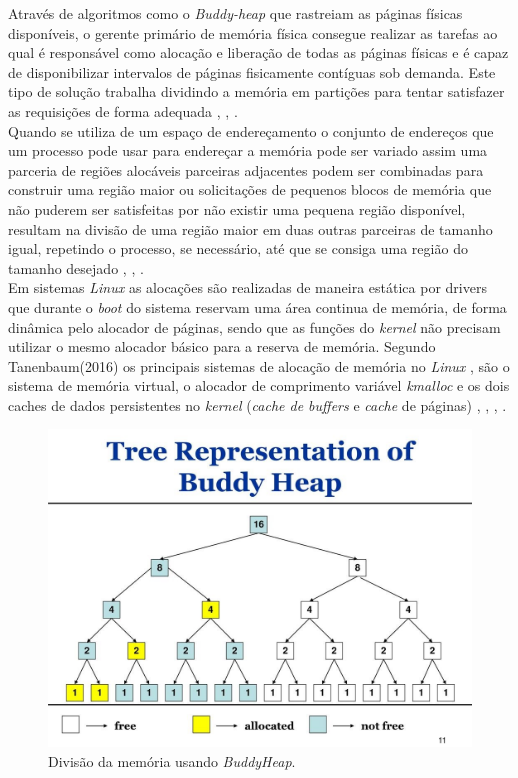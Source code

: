 Através de algoritmos como o \emph{Buddy-heap} que rastreiam as páginas físicas disponíveis, o gerente primário de memória física consegue realizar as tarefas ao qual é responsável como alocação e liberação de todas as páginas físicas e é capaz de disponibilizar intervalos de páginas fisicamente contíguas sob demanda. Este tipo de solução trabalha dividindo a memória em partições para tentar satisfazer as requisições de forma adequada \cite{ufscar2019}, \cite{silberschatz2000}, \cite{stallings2004}.\\
Quando se utiliza de um espaço de endereçamento o conjunto de endereços que um processo pode usar para endereçar a memória pode ser variado assim uma parceria de regiões alocáveis parceiras adjacentes podem ser combinadas para construir uma região maior ou solicitações de pequenos blocos de memória que não puderem ser satisfeitas por não existir uma pequena região disponível, resultam na divisão de uma região maior em duas outras parceiras de tamanho igual, repetindo o processo, se necessário, até que se consiga uma região do tamanho desejado \cite{ufscar2019}, \cite{silberschatz2000}, \cite{stallings2004}.\\
Em sistemas \emph{Linux} as alocações são realizadas de maneira estática por drivers que durante o \emph{boot} do sistema reservam uma área continua de memória, de forma dinâmica pelo alocador de páginas, sendo que as funções do \emph{kernel} não precisam utilizar o mesmo alocador básico para a reserva de memória. Segundo Tanenbaum(2016) os principais sistemas de alocação de memória no \emph{Linux} , são o sistema de memória virtual, o alocador de comprimento variável \emph{kmalloc} e os dois caches de dados persistentes no \emph{kernel} (\emph{cache de buffers} e \emph{cache} de páginas) \cite{Tanenbaum2016}, \cite{ufscar2019}, \cite{silberschatz2000}, \cite{stallings2004}.
\begin{figure}[htpb]
    \centering
   \includegraphics[scale=1.3]{imagens/BuddyHeap.jpg}
   \caption{Divisão da memória usando \emph{BuddyHeap}.\cite{arleen2018}}
   \label{fig:BuddyHeap}
\end{figure} 

